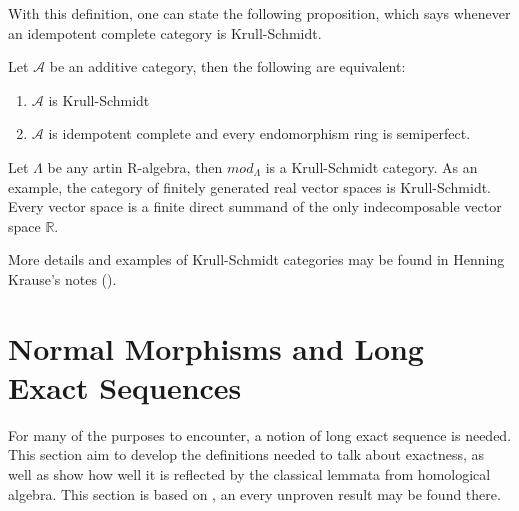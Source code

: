     With this definition, one can state the following proposition, which says whenever an idempotent complete category is Krull-Schmidt.

    \begin{prop}
        Let $\mathcal{A}$ be an additive category, then the following are equivalent:
        \begin{enumerate}
            \item $\mathcal{A}$ is Krull-Schmidt
            \item $\mathcal{A}$ is idempotent complete and every endomorphism ring is semiperfect.
        \end{enumerate}
    \end{prop}




    \begin{example}
        Let $\Lambda$ be any artin R-algebra, then $mod_{\Lambda}$ is a Krull-Schmidt category. As an example, the category of finitely generated real vector spaces is Krull-Schmidt. Every vector space is a finite direct summand of the only indecomposable vector space $\mathbb{R}$.
    \end{example}

    More details and examples of Krull-Schmidt categories may be found in Henning Krause's notes (\cite{Kra12}).

\section{Normal Morphisms and Long Exact Sequences}

    For many of the purposes to encounter, a notion of long exact sequence is needed. This section aim to develop the definitions needed to talk about exactness, as well as show how well it is reflected by the classical lemmata from homological algebra. This section is based on \cite{buhler}, an every unproven result may be found there.
    

